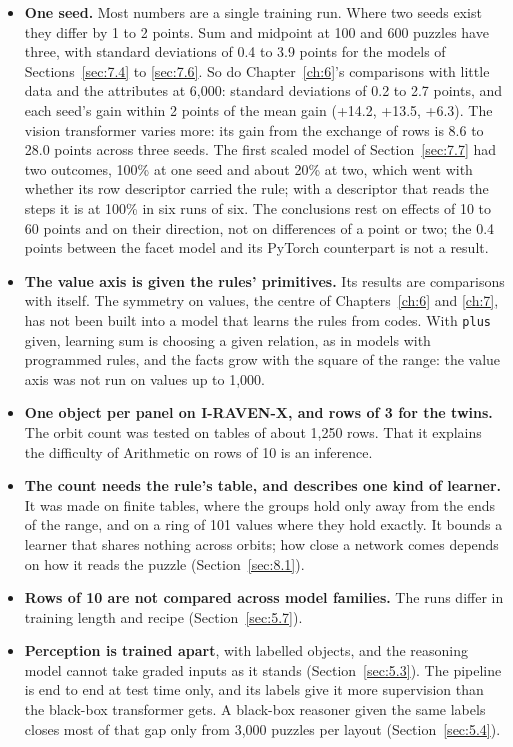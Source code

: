\begin{itemize}
\item \textbf{One seed.} Most numbers are a single training run. Where two seeds exist they differ by 1 to 2 points. Sum and midpoint at 100 and 600 puzzles have three, with standard deviations of 0.4 to 3.9 points for the models of Sections~\ref{sec:7.4} to \ref{sec:7.6}. So do Chapter~\ref{ch:6}'s comparisons with little data and the attributes at 6,000: standard deviations of 0.2 to 2.7 points, and each seed's gain within 2 points of the mean gain (+14.2, +13.5, +6.3). The vision transformer varies more: its gain from the exchange of rows is 8.6 to 28.0 points across three seeds. The first scaled model of Section~\ref{sec:7.7} had two outcomes, 100\% at one seed and about 20\% at two, which went with whether its row descriptor carried the rule; with a descriptor that reads the steps it is at 100\% in six runs of six. The conclusions rest on effects of 10 to 60 points and on their direction, not on differences of a point or two; the 0.4 points between the facet model and its PyTorch counterpart is not a result.
\item \textbf{The value axis is given the rules' primitives.} Its results are comparisons with itself. The symmetry on values, the centre of Chapters~\ref{ch:6} and \ref{ch:7}, has not been built into a model that learns the rules from codes. With \texttt{plus} given, learning sum is choosing a given relation, as in models with programmed rules, and the facts grow with the square of the range: the value axis was not run on values up to 1,000.
\item \textbf{One object per panel on I-RAVEN-X, and rows of 3 for the twins.} The orbit count was tested on tables of about 1,250 rows. That it explains the difficulty of Arithmetic on rows of 10 is an inference.
\item \textbf{The count needs the rule's table, and describes one kind of learner.} It was made on finite tables, where the groups hold only away from the ends of the range, and on a ring of 101 values where they hold exactly. It bounds a learner that shares nothing across orbits; how close a network comes depends on how it reads the puzzle (Section~\ref{sec:8.1}).
\item \textbf{Rows of 10 are not compared across model families.} The runs differ in training length and recipe (Section~\ref{sec:5.7}).
\item \textbf{Perception is trained apart}, with labelled objects, and the reasoning model cannot take graded inputs as it stands (Section~\ref{sec:5.3}). The pipeline is end to end at test time only, and its labels give it more supervision than the black-box transformer gets. A black-box reasoner given the same labels closes most of that gap only from 3,000 puzzles per layout (Section~\ref{sec:5.4}).

\end{itemize}
